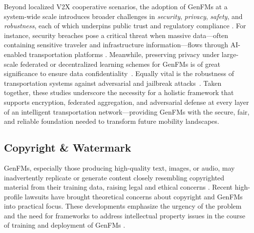 Beyond localized V2X cooperative scenarios, the adoption of GenFMs at a system-wide scale introduces broader challenges in \emph{security}, \emph{privacy}, \emph{safety}, and \emph{robustness}, each of which underpins public trust and regulatory compliance \cite{liang2024trustworthy}. For instance, security breaches pose a critical threat when massive data—often containing sensitive traveler and infrastructure information—flows through AI-enabled transportation platforms \cite{10605184}. Meanwhile, preserving privacy under large-scale federated or decentralized learning schemes for GenFMs is of great significance to ensure data confidentiality~\cite{zhang2024advancing}. Equally vital is the robustness of transportation systems against adversarial and jailbreak attacks~\cite{wang2024data,yi2024jailbreak}. Taken together, these studies underscore the necessity for a holistic framework that supports encryption, federated aggregation, and adversarial defense at every layer of an intelligent transportation network—providing GenFMs with the secure, fair, and reliable foundation needed to transform future mobility landscapes.

\subsection{Copyright \& Watermark}
GenFMs, especially those producing high-quality text, images, or audio, may inadvertently replicate or generate content closely resembling copyrighted material from their training data, raising legal and ethical concerns \cite{totonews, Misinformation1, Misinformation2}. Recent high-profile lawsuits have brought theoretical concerns about copyright and GenFMs into practical focus. These developments emphasize the urgency of the problem and the need for frameworks to address intellectual property issues in the course of training and deployment of GenFMs \cite{concordmusicgroup, the-new-york-times-company-v-microsoft-corporation}.


